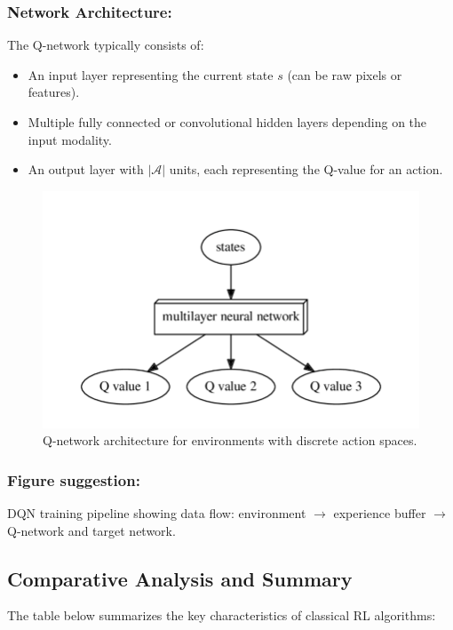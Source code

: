 \documentclass[../Main.tex]{subfiles}
\begin{document}
\subsubsection{Network Architecture:}

The Q-network typically consists of:
\begin{itemize}
    \item An input layer representing the current state $s$ (can be raw pixels or features).
    \item Multiple fully connected or convolutional hidden layers depending on the input modality.
    \item An output layer with $|\mathcal{A}|$ units, each representing the Q-value for an action.
\end{itemize}

\begin{figure}[h]
    \centering
    \includegraphics[width=0.7\linewidth]{img/dqn-discrete.png}
    \caption{Q-network architecture for environments with discrete action spaces.}
\end{figure}

\subsubsection{Figure suggestion:} DQN training pipeline showing data flow: environment $\rightarrow$ experience buffer $\rightarrow$ Q-network and target network.

\subsection{Comparative Analysis and Summary}

The table below summarizes the key characteristics of classical RL algorithms:
\end{document}
